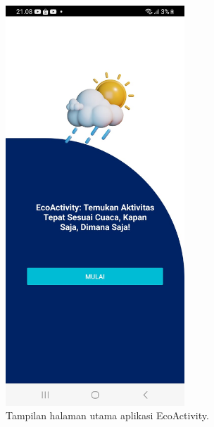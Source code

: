 \documentclass[journal,article,submit,pdftex,moreauthors]{Definitions/mdpi}
\begin{document}
\begin{figure}[H]
    \centering
    \includegraphics[width=0.6\textwidth]{Definitions/images/01.jpeg}
    \caption{Tampilan halaman utama aplikasi EcoActivity.}
    \label{fig:main-page}
\end{figure}
\end{document}
